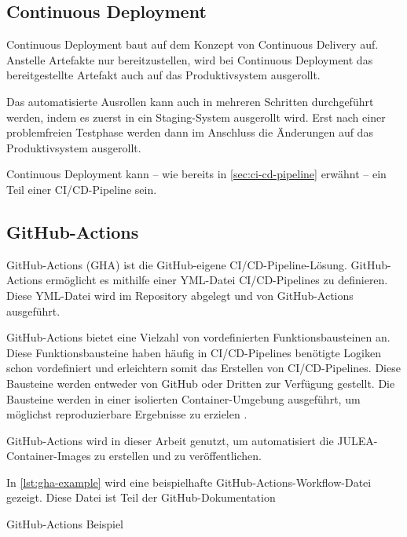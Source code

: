 \pagebreak

\subsection{Continuous Deployment}

Continuous Deployment baut auf dem Konzept von Continuous Delivery auf. Anstelle Artefakte nur bereitzustellen, wird bei Continuous Deployment das bereitgestellte Artefakt auch auf das Produktivsystem ausgerollt.

Das automatisierte Ausrollen kann auch in mehreren Schritten durchgeführt werden, indem es zuerst in ein Staging-System ausgerollt wird. Erst nach einer problemfreien Testphase werden dann im Anschluss die Änderungen auf das Produktivsystem ausgerollt. 

Continuous Deployment kann – wie bereits in \cref{sec:ci-cd-pipeline} erwähnt – ein Teil einer CI/CD-Pipeline sein.

\subsection{GitHub-Actions}

GitHub-Actions (GHA) ist die GitHub-eigene CI/CD-Pipeline-Lösung. GitHub-Actions ermöglicht es mithilfe einer YML-Datei CI/CD-Pipelines zu definieren. Diese YML-Datei wird im Repository abgelegt und von GitHub-Actions ausgeführt. 

GitHub-Actions bietet eine Vielzahl von vordefinierten Funktionsbausteinen an. Diese Funktionsbausteine haben häufig in CI/CD-Pipelines benötigte Logiken schon vordefiniert und erleichtern somit das Erstellen von CI/CD-Pipelines. Diese Bausteine werden entweder von GitHub oder Dritten zur Verfügung gestellt. Die Bausteine werden in einer isolierten Container-Umgebung ausgeführt, um möglichst reproduzierbare Ergebnisse zu erzielen \cite{githubGitHubActions}.

GitHub-Actions wird in dieser Arbeit genutzt, um automatisiert die JULEA-Container-Images zu erstellen und zu veröffentlichen.

In \cref{lst:gha-example} wird eine beispielhafte GitHub-Actions-Workflow-Datei gezeigt. Diese Datei ist Teil der GitHub-Dokumentation \cite{githubSchnellstartFuerGitHub}

\begin{listing}[H]
    \caption{GitHub-Actions Beispiel}
    \label{lst:gha-example}
    \inputminted{yaml}{./code-examples/gha.yml}
\end{listing}


